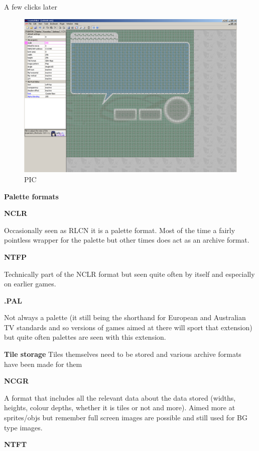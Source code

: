 \documentclass[
]{book}
\begin{document}
A few clicks later

\begin{figure}
\centering
\includegraphics{images/55_home_fast6191_romhackingguide_unrenamed_file___ginal_borders_7wizardozndsdemohack15jul2011.png}
\caption{PIC}
\end{figure}

\textbf{Palette formats}

\textbf{NCLR}

Occasionally seen as RLCN it is a palette format. Most of the time a fairly pointless wrapper for the palette but other times does act as an archive format.

\textbf{NTFP}

Technically part of the NCLR format but seen quite often by itself and especially on earlier games.

\textbf{.PAL}

Not always a palette (it still being the shorthand for European and Australian TV standards and so versions of games aimed at there will sport that extension) but quite often palettes are seen with this extension.

\textbf{Tile storage} Tiles themselves need to be stored and various archive formats have been made for them

\textbf{NCGR}

A format that includes all the relevant data about the data stored (widths, heights, colour depths, whether it is tiles or not and more). Aimed more at sprites/objs but remember full screen images are possible and still used for BG type images.

\textbf{NTFT}
\end{document}

